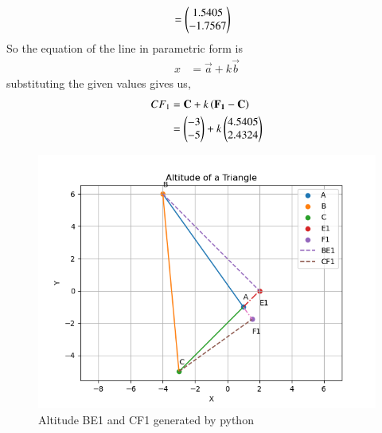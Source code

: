 \documentclass[journal,12pt,twocolumn]{IEEEtran}
\theoremstyle{remark}
\begin{document}
\begin{enumerate}
\begin{align}
	&=\begin{pmatrix}1.5405\\-1.7567\end{pmatrix}
\end{align}
So the equation of the line in parametric form is
\begin{align}
	x&=\vec{a}+k \vec{b}
\end{align}
substituting the given values gives us,
\begin{align}
            CF_1&= \mathbf{C} + k \left( \mathbf{F_1}-\mathbf{C}\right)\\
            &=\begin{pmatrix}-3\\-5\end{pmatrix} + k \begin{pmatrix}4.5405\\2.4324\end{pmatrix}
\end{align}
\begin{figure}[h]
            \includegraphics[width=\columnwidth]{figs/Figure_1.png}
            \caption{Altitude BE1 and CF1 generated by python}
            \label{fig:altBE1andCF1}
\end{figure}

\end{enumerate}
\end{document}
